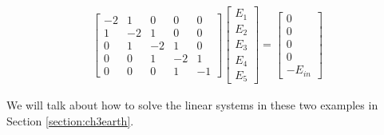\begin{solution}
\begin{align*}
\begin{bmatrix}
-2 & 1 & 0 & 0 & 0 \\
1 & -2 & 1 & 0 & 0 \\
0 & 1 & -2 & 1 & 0 \\
0 & 0 & 1 & -2 & 1 \\
0 & 0 & 0 & 1 & -1
\end{bmatrix}
\begin{bmatrix}
E_1 \\
E_2 \\
E_3 \\
E_4 \\
E_5
\end{bmatrix}
=
\begin{bmatrix}
0 \\
0 \\
0 \\
0 \\
-E_{in}
\end{bmatrix}
\end{align*}
\end{solution}
We will talk about how to solve the linear systems in these two examples in Section \ref{section:ch3earth}.

